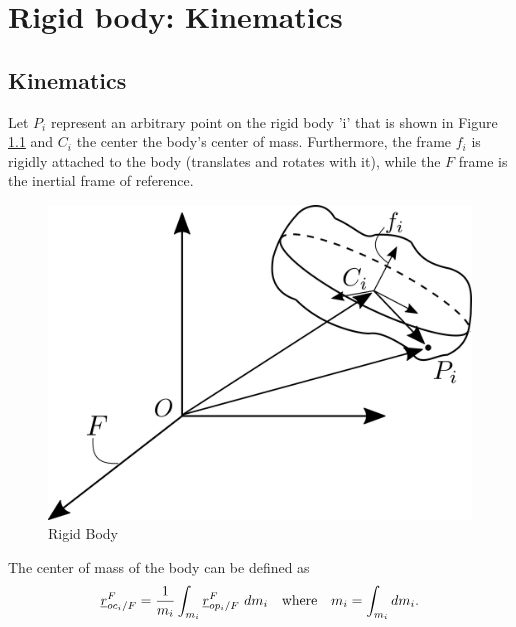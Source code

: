 



\setlength\parindent{0pt}


\clearpage
\setcounter{page}{1}

\chapter{Rigid body: Kinematics}

\section{Kinematics}

Let $P_{i}$ represent an arbitrary point on the rigid body 'i' that is 
shown in Figure \ref{fig:rigid_body} and $C_{i}$ the center the body's center of 
mass. Furthermore, the frame $f_{i}$ is rigidly attached to the body (translates
and rotates with it), while the $F$ frame is the inertial frame of reference.

\begin{figure}[h]
    \centering\includegraphics[scale=0.2]{Images/rigid_body_diagram.png}
    \caption{Rigid Body}
    \label{fig:rigid_body}
\end{figure}

The center of mass of the body can be defined as
\[
    \pvec{r}{oc_{i}}{F}{F} = \frac{1}{m_{i}}\int_{m_i} \pvec{r}{op_{i}}{F}{F} \  dm_{i}
    \quad \text{where} \quad m_{i} = \int_{m_i} dm_{i}.
\]

